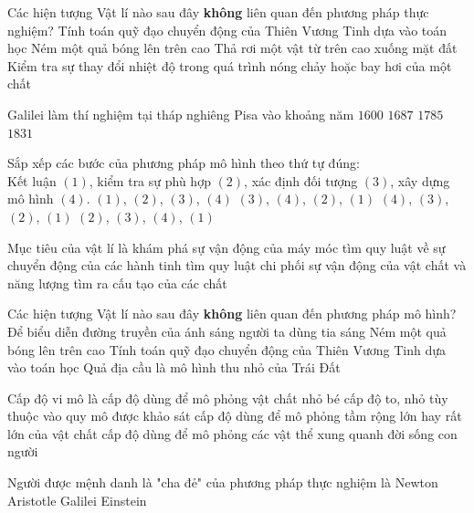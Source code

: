 \begin{ex}%
Các hiện tượng Vật lí nào sau đây \textbf{không} liên quan đến phương pháp thực nghiệm?
\choice
{\True Tính toán quỹ đạo chuyển động của Thiên Vương Tinh dựa vào toán học}
{Ném một quả bóng lên trên cao}
{Thả rơi một vật từ trên cao xuống mặt đất}
{Kiểm tra sự thay đổi nhiệt độ trong quá trình nóng chảy hoặc bay hơi của một chất}	
\end{ex}


\begin{ex}%
Galilei làm thí nghiệm tại tháp nghiêng Pisa vào khoảng năm
\choice
{\True $1600$}
{$1687$}
{$1785$}
{$1831$}	
\end{ex}



\begin{ex}%
Sắp xếp các bước của phương pháp mô hình theo thứ tự đúng:\\ Kết luận $(1)$, kiểm tra sự phù hợp $(2)$, xác định đối tượng $(3)$, xây dựng mô hình $(4)$.
\choice
{$(1)$, $(2)$, $(3)$, $(4)$}
{\True $(3)$, $(4)$, $(2)$, $(1)$}
{$(4)$, $(3)$, $(2)$, $(1)$}
{$(2)$, $(3)$, $(4)$, $(1)$}
\end{ex}

\begin{ex}%
Mục tiêu của vật lí là
\choice
{khám phá sự vận động của máy móc}
{tìm quy luật về sự chuyển động của các hành tinh}
{\True tìm quy luật chi phối sự vận động của vật chất và năng lượng}
{tìm ra cấu tạo của các chất}
\loigiai{

}
\end{ex}
\begin{ex}%
Các hiện tượng Vật lí nào sau đây \textbf{không} liên quan đến phương pháp mô hình?
\choice
{Để biểu diễn đường truyền của ánh sáng người ta dùng tia sáng}
{\True Ném một quả bóng lên trên cao}
{Tính toán quỹ đạo chuyển động của Thiên Vương Tinh dựa vào toán học}
{Quả địa cầu là mô hình thu nhỏ của Trái Đất}

\end{ex}

\begin{ex}%
Cấp độ vi mô là
\choice
{\True cấp độ dùng để mô phỏng vật chất nhỏ bé}
{cấp độ to, nhỏ tùy thuộc vào quy mô được khảo sát}
{cấp độ dùng để mô phỏng tầm rộng lớn hay rất lớn của vật chất}
{cấp độ dùng để mô phỏng các vật thể xung quanh đời sống con người}
\loigiai{

}
\end{ex}
\begin{ex}%
Người được mệnh danh là "cha đẻ" của phương pháp thực nghiệm là
\choice
{Newton}
{Aristotle}
{\True Galilei}
{Einstein}
\loigiai{

}
\end{ex}
